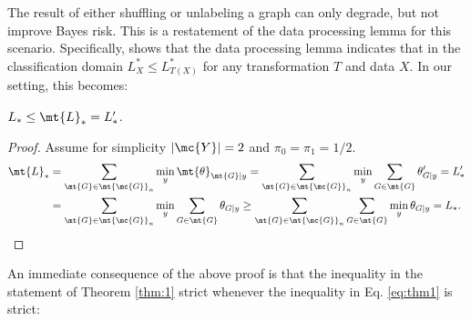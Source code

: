 \documentclass[10pt,journal,cspaper,compsoc]{IEEEtran}
\begin{document}



The result of either shuffling or unlabeling a graph can only degrade, but not improve Bayes risk.  This is a restatement of the data processing lemma for this scenario. Specifically, \cite{Devroye1996} shows that the data processing lemma indicates that in the classification domain $L^*_X \leq L^*_{T(X)}$ for any transformation $T$ and data $X$.  In our setting, this becomes:

\begin{thm} \label{thm:1}
$L_* \leq \mt{L}_*=L_*'$.
\end{thm}

\begin{proof}
	Assume for simplicity $|\mc{Y}|=2$ and $\pi_0=\pi_1=1/2$.  
\begin{align} \label{eq:thm1}
	\mt{L}_*&=\sum_{\mt{G} \in \mt{\mc{G}}_n} \min_y  \mt{\theta}_{\mt{G}|y}  
	=\sum_{\mt{G} \in \mt{\mc{G}}_n} \min_y  \sum_{G \in \mt{G}}\theta_{G|y}'  = L_*' \nonumber \\
	&=\sum_{\mt{G} \in \mt{\mc{G}}_n} \min_y  \sum_{G \in \mt{G}}\theta_{G|y} 
	 \geq \sum_{\mt{G} \in \mt{\mc{G}}_n} \sum_{G \in \mt{G}} \min_y  \theta_{G|y}  = L_*.
\end{align}
\end{proof}



An immediate consequence of the above proof is that the inequality in the statement of Theorem \ref{thm:1} strict whenever the inequality in Eq. \eqref{eq:thm1} is strict:
\end{document}
